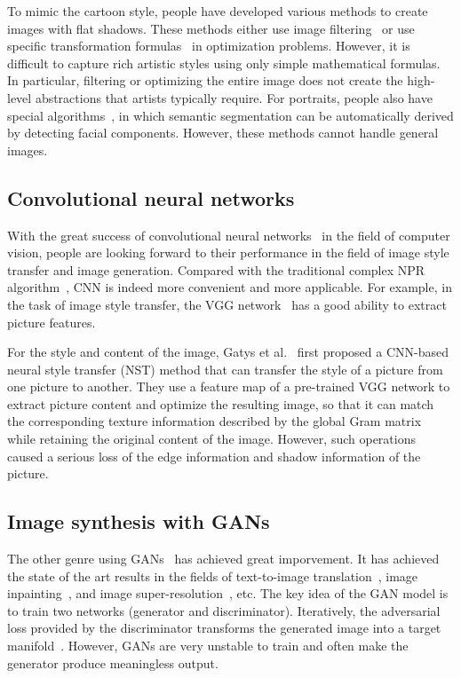 \documentclass[10pt,twocolumn,letterpaper]{article}
\begin{document}
To mimic the cartoon style, people have developed various methods to create 
images with flat shadows. These methods either use image filtering~\cite{winnemoller2006real} or use specific 
transformation formulas~\cite{xu2011image} in optimization problems. However, it is difficult to 
capture rich artistic styles using only simple mathematical formulas. In 
particular, filtering or optimizing the entire image does not create the 
high-level abstractions that artists typically require. For portraits, people 
also have special algorithms~\cite{yang2010semantics, rosin2015non}, in which semantic segmentation can be automatically 
derived by detecting facial components. However, these methods cannot handle general images.

\subsection{Convolutional neural networks}
With the great success of convolutional neural networks~\cite{krizhevsky2012imagenet, lawrence1997face} in the field of 
computer vision, people are looking forward to their performance in the 
field of image style transfer and image generation. Compared with the 
traditional complex NPR algorithm~\cite{saito1990comprehensible,luque2012cel}, CNN is indeed more convenient and more 
applicable. For example, in the task of image style transfer, the VGG 
network~\cite{VGG} has a good ability to extract picture features.

For the style and content of the image, Gatys et al.~\cite{NST} first proposed a 
CNN-based neural style transfer (NST) method that can transfer the style 
of a picture from one picture to another. They use a feature map of a 
pre-trained VGG network to extract picture content and optimize the 
resulting image, so that it can match the corresponding texture information 
described by the global Gram matrix~\cite{gatys2015texture} while retaining the original content 
of the image. However, such operations caused a serious loss of the edge 
information and shadow information of the picture.

\subsection{Image synthesis with GANs}
The other genre using GANs~\cite{GAN} has achieved great imporvement. It has achieved 
the state of the art results in the fields of text-to-image translation~\cite{reed2016generative}, image 
inpainting~\cite{yeh2016semantic}, and image super-resolution~\cite{ledig2017photo}, etc. The key idea of the GAN model 
is to train two networks (generator and discriminator). Iteratively, 
the adversarial loss provided by the discriminator transforms the 
generated image into a target manifold~\cite{yeh2016semantic}. However, GANs are very unstable to train and 
often make the generator produce meaningless output.
\end{document}
